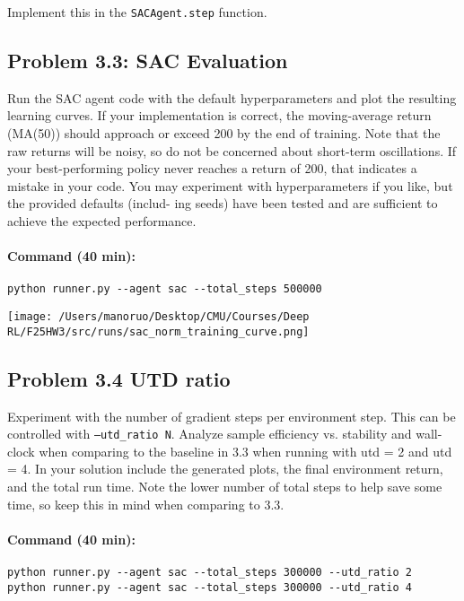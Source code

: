 \documentclass[12pt]{article}
\begin{document}
\noindent
Implement this in the \texttt{SACAgent.step} function.

\subsection*{Problem 3.3: SAC Evaluation}

Run the SAC agent code with the default hyperparameters and plot the resulting learning curves.
If your implementation is correct, the moving-average return (MA(50)) should approach
or exceed 200 by the end of training. Note that the raw returns will be noisy, so do not
be concerned about short-term oscillations. If your best-performing policy never reaches a
return of 200, that indicates a mistake in your code.
You may experiment with hyperparameters if you like, but the provided defaults (includ-
ing seeds) have been tested and are sufficient to achieve the expected performance.

\paragraph{Command (40 min):}
\begin{verbatim}
python runner.py --agent sac --total_steps 500000
\end{verbatim}

\begin{solution}[height=10cm]
 \centering
    \texttt{[image: /Users/manoruo/Desktop/CMU/Courses/Deep RL/F25HW3/src/runs/sac\_norm\_training\_curve.png]}
    \label{fig:sac_norm}
\end{solution}

\subsection*{Problem 3.4 UTD ratio}
Experiment with the number of gradient steps per environment step.  This can be controlled with \texttt{--utd\_ratio N}. Analyze sample efficiency vs. stability and wall-clock when comparing to the baseline in 3.3 when running with utd = 2 and utd = 4.  In your solution include the generated plots, the final environment return, and the total run time. Note the lower number of total steps to help save some time, so keep this in mind when comparing to 3.3.

\paragraph{Command (40 min):}
\begin{verbatim}
python runner.py --agent sac --total_steps 300000 --utd_ratio 2
python runner.py --agent sac --total_steps 300000 --utd_ratio 4
\end{verbatim}
\end{document}
